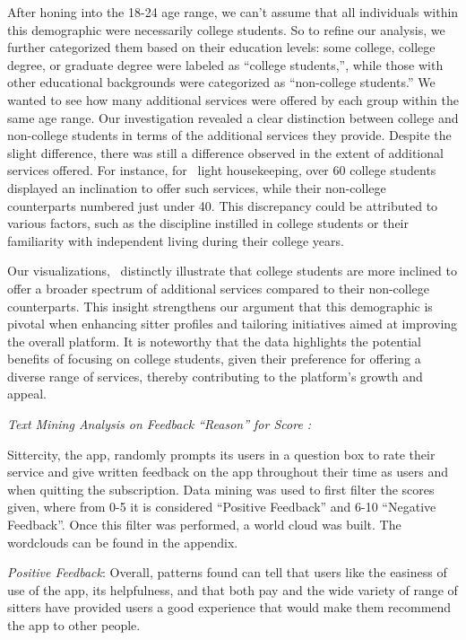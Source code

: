 \documentclass[12pt]{article}
\begin{document}
After honing into the 18-24 age range, we can't assume that all
individuals within this demographic were necessarily college students.
So to refine our analysis, we further categorized them based on their
education levels: some college, college degree, or graduate degree were
labeled as ``college students,'', while those with other educational
backgrounds were categorized as ``non-college students.'' We wanted to
see how many additional services were offered by each group within the
same age range. Our investigation revealed a clear distinction between
college and non-college students in terms of the additional services
they provide. Despite the slight difference, there was still a
difference observed in the extent of additional services offered. For
instance, for~ light housekeeping, over 60 college students displayed an
inclination to offer such services, while their non-college counterparts
numbered just under 40. This discrepancy could be attributed to various
factors, such as the discipline instilled in college students or their
familiarity with independent living during their college years.

Our visualizations,~ distinctly illustrate that college students are
more inclined to offer a broader spectrum of additional services
compared to their non-college counterparts. This insight strengthens our
argument that this demographic is pivotal when enhancing sitter profiles
and tailoring initiatives aimed at improving the overall platform. It is
noteworthy that the data highlights the potential benefits of focusing
on college students, given their preference for offering a diverse range
of services, thereby contributing to the platform's growth and appeal.

\emph{Text Mining Analysis on Feedback ``Reason'' for Score :}

Sittercity, the app, randomly prompts its users in a question box to
rate their service and give written feedback on the app throughout their
time as users and when quitting the subscription. Data mining was used
to first filter the scores given, where from 0-5 it is considered
``Positive Feedback'' and 6-10 ``Negative Feedback''. Once this filter
was performed, a world cloud was built. The wordclouds can be found in
the appendix.

\emph{Positive Feedback}: Overall, patterns found can tell that users
like the easiness of use of the app, its helpfulness, and that both pay
and the wide variety of range of sitters have provided users a good
experience that would make them recommend the app to other people.
\end{document}
